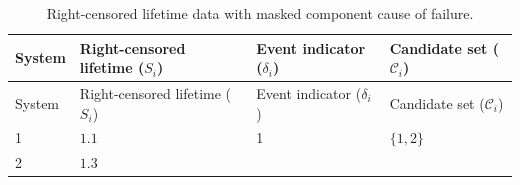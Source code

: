 \documentclass[
]{article}
\theoremstyle{definition}
\theoremstyle{plain}
\theoremstyle{definition}
\theoremstyle{definition}
\theoremstyle{definition}
\theoremstyle{definition}
\theoremstyle{remark}
\begin{document}
\begin{longtable}[]{@{}llll@{}}
\caption{Right-censored lifetime data with masked component cause of failure.}\tabularnewline
\toprule
\begin{minipage}[b]{0.06\columnwidth}\raggedright
System\strut
\end{minipage} & \begin{minipage}[b]{0.32\columnwidth}\raggedright
Right-censored lifetime (\(S_i\))\strut
\end{minipage} & \begin{minipage}[b]{0.28\columnwidth}\raggedright
Event indicator (\(\delta_i\))\strut
\end{minipage} & \begin{minipage}[b]{0.22\columnwidth}\raggedright
Candidate set (\(\mathcal{C}_i\))\strut
\end{minipage}\tabularnewline
\midrule
\endfirsthead
\toprule
\begin{minipage}[b]{0.06\columnwidth}\raggedright
System\strut
\end{minipage} & \begin{minipage}[b]{0.32\columnwidth}\raggedright
Right-censored lifetime (\(S_i\))\strut
\end{minipage} & \begin{minipage}[b]{0.28\columnwidth}\raggedright
Event indicator (\(\delta_i\))\strut
\end{minipage} & \begin{minipage}[b]{0.22\columnwidth}\raggedright
Candidate set (\(\mathcal{C}_i\))\strut
\end{minipage}\tabularnewline
\midrule
\endhead
\begin{minipage}[t]{0.06\columnwidth}\raggedright
1\strut
\end{minipage} & \begin{minipage}[t]{0.32\columnwidth}\raggedright
\(1.1\)\strut
\end{minipage} & \begin{minipage}[t]{0.28\columnwidth}\raggedright
1\strut
\end{minipage} & \begin{minipage}[t]{0.22\columnwidth}\raggedright
\(\{1,2\}\)\strut
\end{minipage}\tabularnewline
\begin{minipage}[t]{0.06\columnwidth}\raggedright
2\strut
\end{minipage} & \begin{minipage}[t]{0.32\columnwidth}\raggedright
\(1.3\)\strut
\end{minipage} & \begin{minipage}[t]{0.28\columnwidth}\raggedright

\end{minipage}
\end{longtable}
\end{document}
